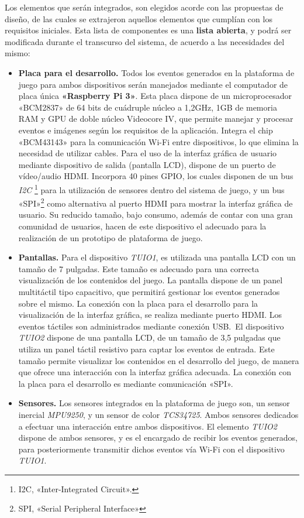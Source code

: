 Los elementos que serán integrados, son elegidos acorde con las propuestas de diseño, de las cuales se extrajeron aquellos elementos que cumplían con los requisitos iniciales. Esta lista de componentes es una \textbf{lista abierta}, y podrá ser modificada durante el transcurso del sistema, de acuerdo a las necesidades del mismo:

\begin{itemize}
\item \textbf{Placa para el desarrollo.} Todos los eventos generados en la plataforma de juego para ambos dispositivos serán manejados mediante el computador de placa única \textbf{«Raspberry Pi 3»}. Esta placa dispone de un microprocesador «BCM2837» de 64 bits de cuádruple núcleo a 1,2GHz, 1GB de memoria RAM y GPU de doble núcleo Videocore IV, que permite manejar y procesar eventos e imágenes según los requisitos de la aplicación.
Integra el chip «BCM43143» para la comunicación Wi-Fi entre dispositivos, lo que elimina la necesidad de utilizar cables. Para el uso de la interfaz gráfica de usuario mediante dispositivo de salida (pantalla LCD), dispone de un puerto de vídeo/audio HDMI. Incorpora 40 pines GPIO, los cuales disponen de un bus \emph{I2C} \footnote{I2C, «Inter-Integrated Circuit».} para la utilización de sensores dentro del sistema de juego, y un bus «SPI»\footnote{SPI, «Serial Peripheral Interface» } como alternativa al puerto HDMI para mostrar la interfaz gráfica de usuario.
Su reducido tamaño, bajo consumo, además de contar con una gran comunidad de usuarios, hacen de este dispositivo el adecuado para la realización de un prototipo de plataforma de juego.
\item \textbf{Pantallas.} Para el dispositivo \emph{TUIO1}, es utilizada una pantalla LCD con un tamaño de 7 pulgadas. Este tamaño es adecuado para una correcta visualización de los contenidos del juego. La pantalla dispone de un panel multitáctil tipo capacitivo, que permitirá gestionar los eventos generados sobre el mismo. La conexión con la placa para el desarrollo para la visualización de la interfaz gráfica, se realiza mediante puerto HDMI.
Los eventos táctiles son administrados mediante conexión USB.\
El dispositivo \emph{TUIO2} dispone de una pantalla LCD, de un tamaño de 3,5 pulgadas que utiliza un panel táctil resistivo para captar los eventos de entrada. Este tamaño permite visualizar los contenidos en el desarrollo del juego, de manera que ofrece una interacción con la interfaz gráfica adecuada. La conexión con la placa para el desarrollo es mediante comunicación «SPI».
\item \textbf{Sensores.} Los sensores integrados en la plataforma de juego son, un sensor inercial \emph{MPU9250}, y un sensor de color \emph{TCS34725}. Ambos sensores dedicados a efectuar una interacción entre ambos dispositivos. El elemento \emph{TUIO2} dispone de ambos sensores, y es el encargado de recibir los eventos generados, para posteriormente transmitir dichos eventos vía Wi-Fi con el dispositivo \emph{TUIO1}.\


\end{itemize}
